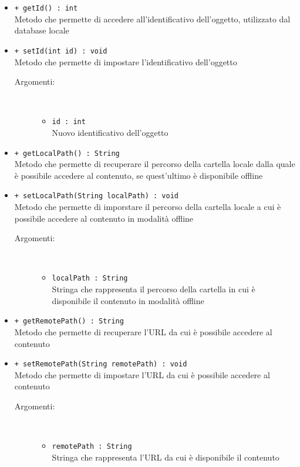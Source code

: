 \documentclass[../Tesi.tex]{subfiles}
\begin{document}
\begin{description}
\begin{itemize}
				\item \texttt{+ getId() : int}\\
				Metodo che permette di accedere all'identificativo dell'oggetto, utilizzato dal database locale 

				\item \texttt{+ setId(int id) : void}\\
				Metodo che permette di impostare l'identificativo dell'oggetto
				\begin{description}
					\item[Argomenti:] \
					\begin{itemize}
						\item \texttt{id : int}\\
						Nuovo identificativo dell'oggetto
					\end{itemize}
				\end{description}

				\item \texttt{+ getLocalPath() : String}\\
				Metodo che permette di recuperare il percorso della cartella locale dalla quale è possibile accedere al contenuto, se quest'ultimo è disponibile offline

				\item \texttt{+ setLocalPath(String localPath) : void}\\
				Metodo che permette di imporstare il percorso della cartella locale a cui è possibile accedere al contenuto in modalità offline
				\begin{description}
					\item[Argomenti:] \
					\begin{itemize}
						\item \texttt{localPath : String}\\
						Stringa che rappresenta il percorso della cartella in cui è disponibile il contenuto in modalità offline
					\end{itemize}
				\end{description}

				\item \texttt{+ getRemotePath() : String}\\
				Metodo che permette di recuperare l'URL da cui è possibile accedere al contenuto

				\item \texttt{+ setRemotePath(String remotePath) : void}\\
				Metodo che permette di impostare l'URL da cui è possibile accedere al contenuto
				\begin{description}
					\item[Argomenti:] \
					\begin{itemize}
						\item \texttt{remotePath : String}\\
						Stringa che rappresenta l'URL da cui è disponibile il contenuto
					\end{itemize}
				\end{description}


\end{itemize}
\end{description}
\end{document}
